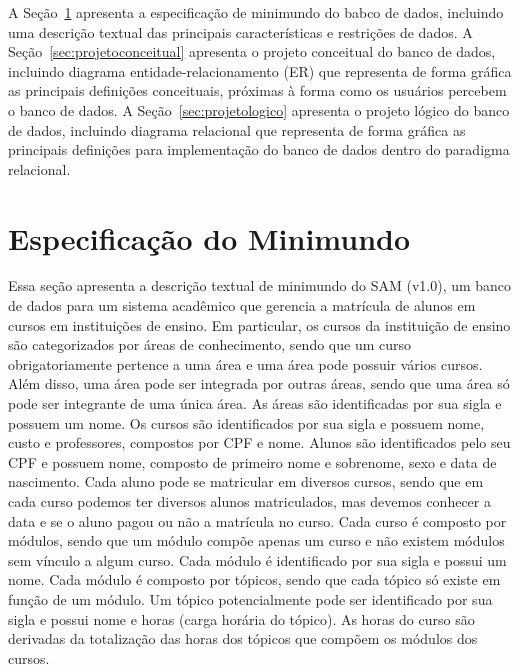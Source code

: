 \documentclass{article}
\begin{document}
A Se\c{c}\~ao~\ref{sec:minimundo} apresenta a especifica\c{c}\~ao de minimundo do babco de dados, incluindo uma descri\c{c}\~ao textual das principais caracter\'isticas e restri\c{c}\~oes de dados.
A Se\c{c}\~ao~\ref{sec:projetoconceitual} apresenta o projeto conceitual do banco de dados, incluindo diagrama entidade-relacionamento (ER) que representa de forma gr\'afica as principais defini\c{c}\~oes conceituais, pr\'oximas \`a forma como os usu\'arios percebem o banco de dados.
A Se\c{c}\~ao~\ref{sec:projetologico} apresenta o projeto l\'ogico do banco de dados, incluindo diagrama relacional que representa de forma gr\'afica as principais defini\c{c}\~oes para implementa\c{c}\~ao do banco de dados dentro do paradigma relacional.

\section{Especifica\c{c}\~ao do Minimundo}
\label{sec:minimundo}
Essa se\c{c}\~ao apresenta a descri\c{c}\~ao textual de minimundo do SAM (v1.0), um banco de dados para um sistema acad\^emico que gerencia a matrícula de alunos em cursos em institui\c{c}\~oes de ensino. Em particular, os cursos da instituição de ensino são categorizados por áreas de conhecimento, sendo que um curso obrigatoriamente pertence a uma área e uma área pode possuir vários cursos. Além disso, uma área pode ser integrada por outras áreas, sendo que uma área só pode ser integrante de uma única área. As áreas são identificadas por sua sigla e possuem um nome. Os cursos são identificados por sua sigla e possuem nome, custo e professores, compostos por CPF e nome.
Alunos são identificados pelo seu CPF e possuem nome, composto de primeiro nome e sobrenome, sexo e data de nascimento. Cada aluno pode se matricular em diversos cursos, sendo que em cada curso podemos ter diversos alunos matriculados, mas devemos conhecer a data e se o aluno pagou ou não a matrícula no curso.
Cada curso é composto por módulos, sendo que um módulo compõe apenas um curso e não existem módulos sem vínculo a algum curso. Cada módulo é identificado por sua sigla e possui um nome. Cada módulo é composto por tópicos, sendo que cada tópico só existe em função de um módulo. Um tópico potencialmente pode ser identificado por sua sigla e possui nome e horas (carga horária do tópico). As horas do curso são derivadas da totalização das horas dos tópicos que compõem os módulos dos cursos.
\end{document}
